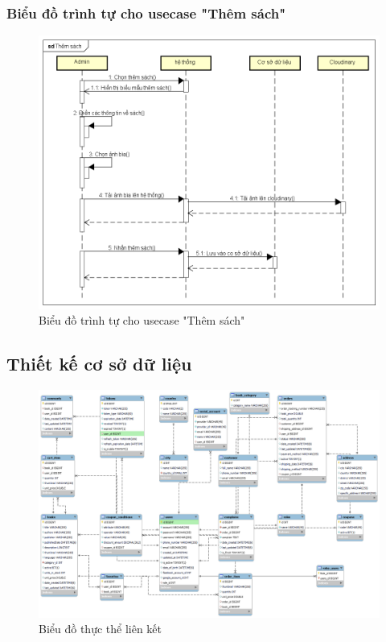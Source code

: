 \documentclass[../DoAn.tex]{subfiles}
\begin{document}
\subsubsection{Biểu đồ trình tự cho usecase "Thêm sách"}
\begin{figure}[H]
    \centering
        \includegraphics[width=1\textwidth]{Hinhve/Thêm sách.png}
    \caption{Biểu đồ trình tự cho usecase "Thêm sách"}
    \label{fig:Fig11}
\end{figure}

\subsection{Thiết kế cơ sở dữ liệu}

\begin{figure}[H]
    \centering
        \includegraphics[width=1\textwidth]{Hinhve/database.png}
    \caption{Biểu đồ thực thể liên kết}
    \label{fig:Fig9}
\end{figure}
\end{document}
